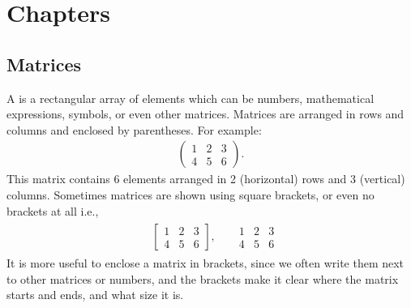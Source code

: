 \documentclass[letterpaper,10pt,english]{jupyterBook}
\begin{document}
\sphinxstepscope


\part{Chapters}

\sphinxstepscope


\chapter{Matrices}
\label{\detokenize{_pages/1.0_Matrices:matrices}}\label{\detokenize{_pages/1.0_Matrices:matrices-chapter}}\label{\detokenize{_pages/1.0_Matrices::doc}}
\ignorespaces 
\sphinxAtStartPar
A  is a rectangular array of elements which can be numbers, mathematical expressions, symbols, or even other matrices. Matrices are arranged in rows and columns and enclosed by parentheses. For example:
\begin{equation*}
\begin{split} \begin{pmatrix}
    1 & 2 & 3 \\
    4 & 5 & 6
\end{pmatrix}.\end{split}
\end{equation*}
\sphinxAtStartPar
This matrix contains 6 elements arranged in 2 (horizontal) rows and 3 (vertical) columns. Sometimes matrices are shown using square brackets, or even no brackets at all i.e.,
\begin{equation*}
\begin{split} \begin{align*}
    &\begin{bmatrix}
        1 & 2 & 3 \\
        4 & 5 & 6
    \end{bmatrix}, &
    &\begin{matrix}
        1 & 2 & 3 \\
        4 & 5 & 6
    \end{matrix}
\end{align*} \end{split}
\end{equation*}
\sphinxAtStartPar
It is more useful to enclose a matrix in brackets, since we often write them next to other matrices or numbers, and the brackets make it clear where the matrix starts and ends, and what size it is.
\end{document}
